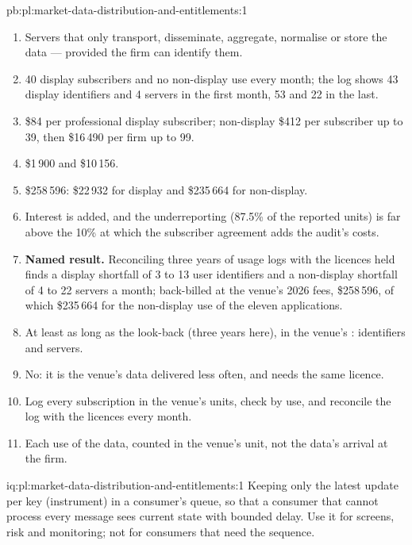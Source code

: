 \begin{solution}{pb:pl:market-data-distribution-and-entitlements:1}
\begin{enumerate}
\item Servers that only transport, disseminate, aggregate, normalise or store the data --- provided the firm can identify them.
\item 40 display subscribers and no non-display use every month; the log shows 43 display identifiers and 4 servers in the first month, 53
and 22 in the last.
\item \$84 per professional display subscriber; non-display \$412 per subscriber up to 39, then \$16\,490 per firm up to 99.
\item \$1\,900 and \$10\,156.
\item \$258\,596: \$22\,932 for display and \$235\,664 for non-display.
\item Interest is added, and the underreporting (87.5\% of the reported units) is far above the 10\% at which the subscriber agreement adds the
audit's costs.
\item \textbf{Named result.} Reconciling three years of usage logs with the licences held finds a display shortfall of 3 to 13 user
identifiers and a non-display shortfall of 4 to 22 servers a month; back-billed at the venue's 2026 fees, \$258\,596, of which \$235\,664 for
the non-display use of the eleven applications.
\item At least as long as the look-back (three years here), in the venue's : identifiers and servers.
\item No: it is the venue's data delivered less often, and needs the same licence.
\item Log every subscription in the venue's units, check  by use, and reconcile the log with the licences every month.
\item Each use of the data, counted in the venue's unit, not the data's arrival at the firm.
\end{enumerate}
\end{solution}

\begin{solution}{iq:pl:market-data-distribution-and-entitlements:1}
Keeping only the latest update per key (instrument) in a consumer's queue, so that a consumer that cannot process every message sees current
state with bounded delay. Use it for screens, risk and monitoring; not for consumers that need the sequence.
\end{solution}


